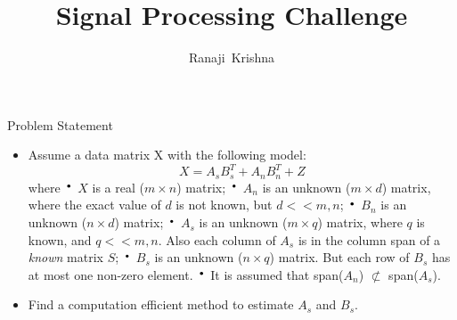 \documentclass{beamer}
\title{Signal Processing Challenge}
\author{Ranaji~Krishna}
\newcommand*{\LargerCdot}{\raisebox{-0.25ex}{\scalebox{2.3}{$\cdot$}}}
\begin{document}
\begin{frame}
  \titlepage
\end{frame}




\begin{frame}{Problem Statement}{}
	\begin{itemize}
		\item{Assume a data matrix X with the following model:} \vspace{0 in}
		\begin{equation}
			X = A_{s} B^{T}_{s} + A_{n} B^{T}_{n}+ Z
		\end{equation}  where \newline
		{$\LargerCdot$ $X$ is a real ($m \times n$) matrix;}\newline 
		{$\LargerCdot$ $A_{n}$ is an unknown ($m \times d$) matrix, where the exact value of $d$ is not known, but $d << m,n$;}\newline 
		{$\LargerCdot$ $B_n$ is an unknown ($n \times d$) matrix;}\newline 
		{$\LargerCdot$ $A_s$ is an unknown ($m \times q$) matrix, where $q$ is known, and $q << m,n$. Also each column of $A_s$ is in the column span of a \textit{known} matrix $S$;}\newline 
		{$\LargerCdot$ $B_s$ is an unknown ($n \times q$) matrix. But each row of $B_s$ has at most one non-zero element.}\newline 
		{$\LargerCdot$ It is assumed that span($A_n$)  $\not\subset$ span($A_s$).}\newline 
		\item{Find a computation efficient method to estimate $A_s$ and $B_s$.} \vspace{0.5 in}
	\end{itemize}
\end{frame}
\end{document}
